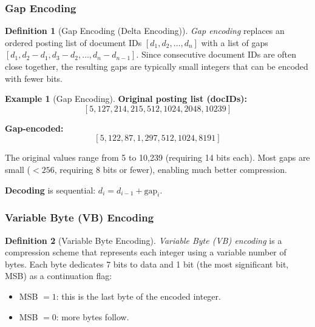 \documentclass[aspectratio=169]{beamer} \usetheme{TUDelft} %
\theoremstyle{definition}
\newtheorem{definition}{Definition}[section]
\newtheorem{example}{Example}[section]
\theoremstyle{plain}
\begin{document}
\subsubsection{Gap Encoding}

\begin{definition}[Gap Encoding (Delta Encoding)]
\label{def:gap-encoding}
\emph{Gap encoding} replaces an ordered posting list of document IDs $[d_1, d_2, \ldots, d_n]$ with a list of gaps $[d_1, d_2 - d_1, d_3 - d_2, \ldots, d_n - d_{n-1}]$. Since consecutive document IDs are often close together, the resulting gaps are typically small integers that can be encoded with fewer bits.
\end{definition}

\begin{example}[Gap Encoding]
\label{ex:gap-encoding}
\textbf{Original posting list (docIDs):}
\[
[5, 127, 214, 215, 512, 1024, 2048, 10239]
\]

\textbf{Gap-encoded:}
\[
[5, 122, 87, 1, 297, 512, 1024, 8191]
\]

The original values range from 5 to 10,239 (requiring 14 bits each). Most gaps are small ($< 256$, requiring 8 bits or fewer), enabling much better compression.

\textbf{Decoding} is sequential: $d_i = d_{i-1} + \mathrm{gap}_i$.
\end{example}


\subsubsection{Variable Byte (VB) Encoding}

\begin{definition}[Variable Byte Encoding]
\label{def:vb-encoding}
\emph{Variable Byte (VB) encoding} is a compression scheme that represents each integer using a variable number of bytes. Each byte dedicates 7 bits to data and 1 bit (the most significant bit, MSB) as a continuation flag:
\begin{itemize}
    \item MSB $= 1$: this is the last byte of the encoded integer.
    \item MSB $= 0$: more bytes follow.
\end{itemize}
\end{definition}
\end{document}
